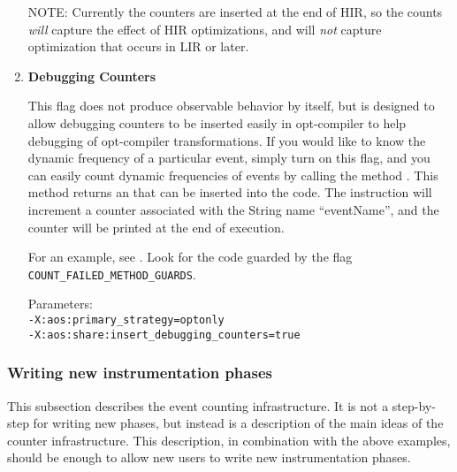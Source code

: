 \begin{enumerate}
NOTE: Currently the counters are inserted at the end of HIR, so the
counts {\em will} capture the effect of HIR optimizations, and will
{\em not} capture optimization that occurs in LIR or later.  

\item {\bf Debugging Counters}  

This flag does not produce observable behavior by itself, but is
designed to allow debugging counters to be inserted easily in
opt-compiler to help debugging of opt-compiler transformations.
If you would like to know the dynamic frequency of a particular
event, simply turn on this flag, and you can easily count dynamic
frequencies of events by calling the method
.  This method
returns an 
that can be inserted into the
code.  The instruction will increment a counter associated with
the String name ``eventName'', and the counter will be printed at the
end of execution.

For an example, see 
.  
Look
for the code guarded by the flag {\tt COUNT\_FAILED\_METHOD\_GUARDS}.
 
Parameters:\\
{\tt -X:aos:primary\_strategy=optonly \\
-X:aos:share:insert\_debugging\_counters=true}

\end{enumerate}

\subsubsection{Writing new instrumentation phases}
\label{adding_phases}
This subsection describes the event counting infrastructure.  It is
not a step-by-step for writing new phases, but instead is a
description of the main ideas of the counter infrastructure.
This description, in combination with the above examples, should be
enough to allow new users to write new instrumentation phases.

